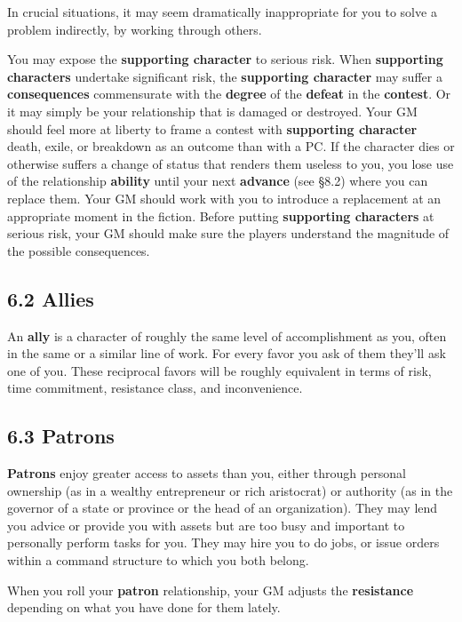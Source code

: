 \documentclass[
  11pt,
]{article}
\begin{document}
In crucial situations, it may seem dramatically inappropriate for you to
solve a problem indirectly, by working through others.

You may expose the \textbf{supporting character} to serious risk. When
\textbf{supporting characters} undertake significant risk, the
\textbf{supporting character} may suffer a \textbf{consequences}
commensurate with the \textbf{degree} of the \textbf{defeat} in the
\textbf{contest}. Or it may simply be your relationship that is damaged
or destroyed. Your GM should feel more at liberty to frame a contest
with \textbf{supporting character} death, exile, or breakdown as an
outcome than with a PC. If the character dies or otherwise suffers a
change of status that renders them useless to you, you lose use of the
relationship \textbf{ability} until your next \textbf{advance} (see
§8.2) where you can replace them. Your GM should work with you to
introduce a replacement at an appropriate moment in the fiction. Before
putting \textbf{supporting characters} at serious risk, your GM should
make sure the players understand the magnitude of the possible
consequences.

\hypertarget{allies}{%
\subsection{6.2 Allies}\label{allies}}

An \textbf{ally} is a character of roughly the same level of
accomplishment as you, often in the same or a similar line of work. For
every favor you ask of them they'll ask one of you. These reciprocal
favors will be roughly equivalent in terms of risk, time commitment,
resistance class, and inconvenience.

\hypertarget{patrons}{%
\subsection{6.3 Patrons}\label{patrons}}

\textbf{Patrons} enjoy greater access to assets than you, either through
personal ownership (as in a wealthy entrepreneur or rich aristocrat) or
authority (as in the governor of a state or province or the head of an
organization). They may lend you advice or provide you with assets but
are too busy and important to personally perform tasks for you. They may
hire you to do jobs, or issue orders within a command structure to which
you both belong.

When you roll your \textbf{patron} relationship, your GM adjusts the
\textbf{resistance} depending on what you have done for them lately.
\end{document}
